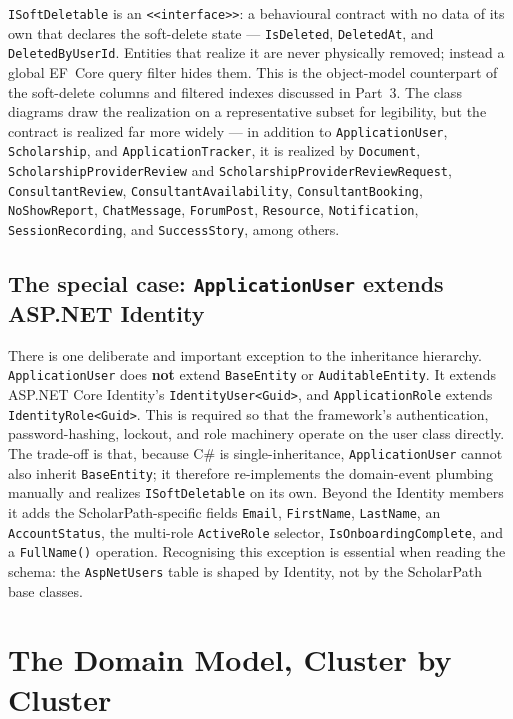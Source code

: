 \documentclass[11pt,a4paper]{article}
\begin{document}
\texttt{ISoftDeletable} is an \texttt{<<interface>>}: a behavioural contract with
no data of its own that declares the soft-delete state --- \texttt{IsDeleted},
\texttt{DeletedAt}, and \texttt{DeletedByUserId}. Entities that realize it are
never physically removed; instead a global EF~Core query filter hides them. This
is the object-model counterpart of the soft-delete columns and filtered indexes
discussed in Part~3. The class diagrams draw the realization on a representative
subset for legibility, but the contract is realized far more widely --- in
addition to \texttt{ApplicationUser}, \texttt{Scholarship}, and
\texttt{ApplicationTracker}, it is realized by \texttt{Document},
\texttt{ScholarshipProviderReview} and \texttt{ScholarshipProviderReviewRequest},
\texttt{ConsultantReview}, \texttt{ConsultantAvailability},
\texttt{ConsultantBooking}, \texttt{NoShowReport}, \texttt{ChatMessage},
\texttt{ForumPost}, \texttt{Resource}, \texttt{Notification},
\texttt{SessionRecording}, and \texttt{SuccessStory}, among others.

\subsection{The special case: \texttt{ApplicationUser} extends ASP.NET Identity}

There is one deliberate and important exception to the inheritance hierarchy.
\texttt{ApplicationUser} does \textbf{not} extend \texttt{BaseEntity} or
\texttt{AuditableEntity}. It extends ASP.NET Core Identity's
\texttt{IdentityUser<Guid>}, and \texttt{ApplicationRole} extends
\texttt{IdentityRole<Guid>}. This is required so that the framework's
authentication, password-hashing, lockout, and role machinery operate on the
user class directly. The trade-off is that, because C\# is single-inheritance,
\texttt{ApplicationUser} cannot also inherit \texttt{BaseEntity}; it therefore
re-implements the domain-event plumbing manually and realizes
\texttt{ISoftDeletable} on its own. Beyond the Identity members it adds the
ScholarPath-specific fields \texttt{Email}, \texttt{FirstName},
\texttt{LastName}, an \texttt{AccountStatus}, the multi-role \texttt{ActiveRole}
selector, \texttt{IsOnboardingComplete}, and a \texttt{FullName()} operation.
Recognising this exception is essential when reading the schema: the
\texttt{AspNetUsers} table is shaped by Identity, not by the ScholarPath base
classes.

\section{The Domain Model, Cluster by Cluster}
\end{document}
